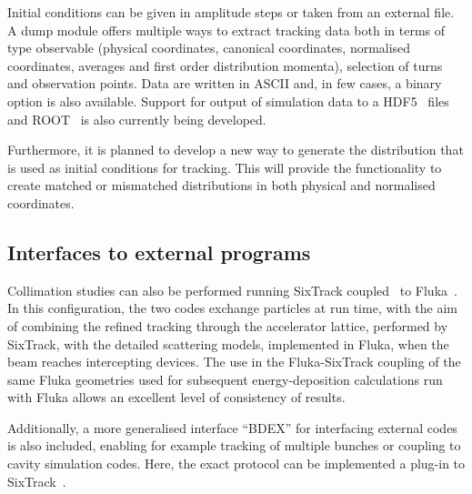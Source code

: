\documentclass[a4paper,
              ]{jacow}
\begin{document}
Initial conditions can be given in amplitude steps or taken from an external file. A dump module offers multiple ways to extract tracking data both in terms of type observable (physical coordinates, canonical coordinates, normalised coordinates, averages and first order distribution momenta), selection of turns and observation points. Data are written in ASCII and, in few cases, a binary option is also available. Support for output of simulation data to a HDF5~\cite{hdf5} files and ROOT~\cite{root} is also currently being developed.

Furthermore, it is planned to develop a new way to generate the distribution that is used as initial conditions for tracking. This will provide the functionality to create matched or mismatched distributions in both physical and normalised coordinates.

\subsection{Interfaces to external programs}

Collimation studies can also be performed running SixTrack coupled~\cite{flukaCouplingVV} to Fluka~\cite{FLUKA1,FLUKA2}. In this configuration, the two codes exchange particles at run time, with the aim of combining the refined tracking through the accelerator lattice, performed by SixTrack, with the detailed scattering models, implemented in Fluka, when the beam reaches intercepting devices. The use in the Fluka-SixTrack coupling of the same Fluka geometries used for subsequent energy-deposition calculations run with Fluka allows an excellent level of consistency of results.

Additionally, a more generalised interface ``BDEX'' for interfacing external codes is also included, enabling for example tracking of multiple bunches or coupling to cavity simulation codes.
Here, the exact protocol can be implemented a plug-in to SixTrack~\cite{recentDevels2}.

\end{document}

